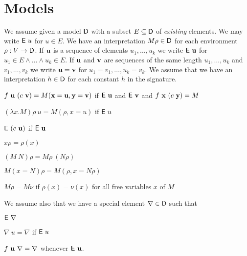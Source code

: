 \documentclass[11pt]{article}
\newtheorem{lemma}[theorem]{Lemma}
\def\DD{\hbox{\sf D}}
\def\Ex{\hbox{\sf E}}
\def\TOP{\nabla}
\begin{document}
\section{Models}

 We assume given a model $\DD$ with a subset $E\subseteq \DD$ of {\em existing} elements. 
We may write $\Ex~u$ for $u\in E$.
We have an interpretation
$M\rho\in\DD$ for each environment $\rho:V\rightarrow\DD$.
If ${\bf u}$ is a sequence of elements
$u_1,\dots,u_k$ we write $\Ex~{\bf u}$ for $u_1\in E\wedge\dots\wedge u_k\in E$. If ${\bf u}$
and ${\bf v}$ are sequences of the same length $u_1,\dots,u_k$ and $v_1,\dots,v_k$
we write ${\bf u} = {\bf v}$ for $u_1=v_1,\dots,u_k=v_k$.
We assume that we have an interpretation $h\in\DD$ for each constant $h$ in the signature.


\medskip

 $f~{\bf u}~(c~{\bf v}) = M({\bf x} = {\bf u},{\bf y}={\bf v})$ if $\Ex~{\bf u}$ and $\Ex~{\bf v}$
and  $f~{\bf x}~(c~{\bf y}) = M$

\medskip

 $(\lambda x.M)\rho~u = M(\rho,x=u)$ if $\Ex~u$

\medskip

$\Ex~(c~{\bf u})$ if $\Ex~{\bf u}$

\medskip

 $x\rho = \rho(x)$

\medskip

 $(M~N)\rho = M\rho~(N\rho)$

\medskip

 $M(x=N)\rho = M(\rho,x=N\rho)$

\medskip

 $M\rho = M\nu$ if $\rho(x) = \nu(x)$ for all free variables $x$ of $M$

\medskip

 We assume also that we have a special element $\TOP\in\DD$ such that

\medskip

 $\Ex~\TOP$ 

\medskip

$\TOP~u = \TOP$ if $\Ex~u$

\medskip

$f~{\bf u}~\TOP = \TOP$ whenever $\Ex~{\bf u}$.

\medskip

\medskip

\end{document}

